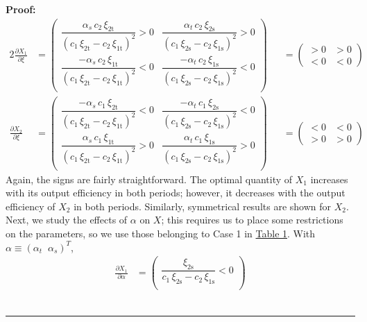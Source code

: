 \documentclass[11pt,a4paper]{extarticle}
\newenvironment{proof}[1][Proof]{\noindent\textbf{#1:} }{\ \rule{0.5em}{0.5em}}
\begin{document}
\begin{proof}
\begin{alignat*}{2}
	\frac{\partial X_1}{\partial \xi} &= 
	\begin{pmatrix}
	\dfrac{\alpha _{s}\,c_{2}\,\xi _{\mathrm{2t}}}{{\left(c_{1}\,\xi _{\mathrm{2t}}-c_{2}\,\xi _{\mathrm{1t}}\right)}^2}>0 & \dfrac{\alpha _{t}\,c_{2}\,\xi _{\mathrm{2s}}}{{\left(c_{1}\,\xi _{\mathrm{2s}}-c_{2}\,\xi _{\mathrm{1s}}\right)}^2}>0 \\
	\dfrac{-\alpha _{s}\,c_{2}\,\xi _{\mathrm{1t}}}{{\left(c_{1}\,\xi _{\mathrm{2t}}-c_{2}\,\xi _{\mathrm{1t}}\right)}^2}<0 & \dfrac{-\alpha _{t}\,c_{2}\,\xi _{\mathrm{1s}}}{{\left(c_{1}\,\xi _{\mathrm{2s}}-c_{2}\,\xi _{\mathrm{1s}}\right)}^2}<0 \\
	\end{pmatrix}
	&&=
	\begin{pmatrix}
	> 0 & > 0  \\
	< 0 & < 0
	\end{pmatrix} \\
	\frac{\partial X_2}{\partial \xi} &= 
	\begin{pmatrix}
	\dfrac{-\alpha _{s}\,c_{1}\,\xi _{\mathrm{2t}}}{{\left(c_{1}\,\xi _{\mathrm{2t}}-c_{2}\,\xi _{\mathrm{1t}}\right)}^2} <0& \dfrac{-\alpha _{t}\,c_{1}\,\xi _{\mathrm{2s}}}{{\left(c_{1}\,\xi _{\mathrm{2s}}-c_{2}\,\xi _{\mathrm{1s}}\right)}^2} <0\\
	\dfrac{\alpha _{s}\,c_{1}\,\xi _{\mathrm{1t}}}{{\left(c_{1}\,\xi _{\mathrm{2t}}-c_{2}\,\xi _{\mathrm{1t}}\right)}^2}>0& \dfrac{\alpha _{t}\,c_{1}\,\xi _{\mathrm{1s}}}{{\left(c_{1}\,\xi _{\mathrm{2s}}-c_{2}\,\xi _{\mathrm{1s}}\right)}^2} >0\\
	\end{pmatrix}
	&&=
	\begin{pmatrix}
	< 0 & < 0 \\
	> 0 & > 0  
	\end{pmatrix}
	\end{alignat*}
	Again, the signs are fairly straightforward. The optimal quantity of $X_1$ increases with its output efficiency in both periods; however, it decreases with the output efficiency of $X_2$ in both periods. Similarly, symmetrical results are shown for $X_2$. Next, we study the effects of $\alpha$ on $X$; this requires us to place some restrictions on the parameters, so we use those belonging to Case 1 in \hyperref[tab:paramrest]{Table 1}. With $\alpha \equiv \left( \alpha_t \;\; \alpha_s \right)^T$, 
	\begin{align*}
	\frac{\partial X_1}{\partial \alpha} &= 
	\begin{pmatrix}
	\dfrac{\xi _{\mathrm{2s}}}{c_{1}\,\xi _{\mathrm{2s}}-c_{2}\,\xi _{\mathrm{1s}}}<0 \\

\end{pmatrix}
\end{align*}
\end{proof}
\end{document}

